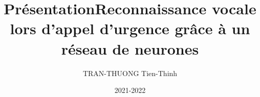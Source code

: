 \documentclass[10pt]{beamer}
\author{TRAN-THUONG Tien-Thinh}
\date{2021-2022}
\title{Présentation}
\begin{document}
\begin{frame}
\title{Reconnaissance vocale lors d’appel d’urgence grâce à un réseau
de neurones}
\titlepage
\end{frame}


\tableofcontents









\end{document}
